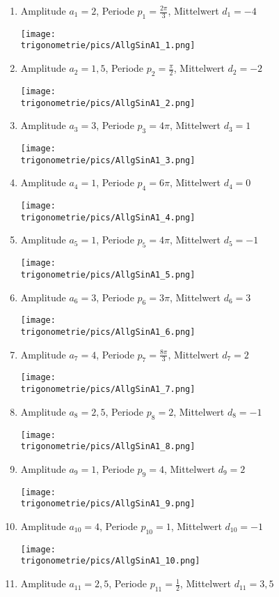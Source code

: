 \begin{Answer}[ref=allgSinCosA1]
	\begin{enumerate}[label=\alph*)]
		\item Amplitude \(a_{1}=2\), Periode \(p_{1}=\frac{2\pi}{3}\), Mittelwert \(d_{1}=-4\)

		\texttt{[image: \\trigonometrie/pics/AllgSinA1\_1.png]}
		\item Amplitude \(a_{2}=1,5\), Periode \(p_{2}=\frac{\pi}{2}\), Mittelwert \(d_{2}=-2\)

		\texttt{[image: \\trigonometrie/pics/AllgSinA1\_2.png]}
		\item Amplitude \(a_{3}=3\), Periode \(p_{3}=4\pi\), Mittelwert \(d_{3}=1\)

		\texttt{[image: \\trigonometrie/pics/AllgSinA1\_3.png]}
		\item Amplitude \(a_{4}=1\), Periode \(p_{4}=6\pi\), Mittelwert \(d_{4}=0\)

		\texttt{[image: \\trigonometrie/pics/AllgSinA1\_4.png]}
        \newpage
		\item Amplitude \(a_{5}=1\), Periode \(p_{5}=4\pi\), Mittelwert \(d_{5}=-1\)

		\texttt{[image: \\trigonometrie/pics/AllgSinA1\_5.png]}
		\item Amplitude \(a_{6}=3\), Periode \(p_{6}=3\pi\), Mittelwert \(d_{6}=3\)

		\texttt{[image: \\trigonometrie/pics/AllgSinA1\_6.png]}
		\item Amplitude \(a_{7}=4\), Periode \(p_{7}=\frac{8\pi}{3}\), Mittelwert \(d_{7}=2\)

		\texttt{[image: \\trigonometrie/pics/AllgSinA1\_7.png]}
		\item Amplitude \(a_{8}=2,5\), Periode \(p_{8}=2\), Mittelwert \(d_{8}=-1\)

		\texttt{[image: \\trigonometrie/pics/AllgSinA1\_8.png]}
        \newpage
		\item Amplitude \(a_{9}=1\), Periode \(p_{9}=4\), Mittelwert \(d_{9}=2\)

		\texttt{[image: \\trigonometrie/pics/AllgSinA1\_9.png]}
		\item Amplitude \(a_{10}=4\), Periode \(p_{10}=1\), Mittelwert \(d_{10}=-1\)

		\texttt{[image: \\trigonometrie/pics/AllgSinA1\_10.png]}
		\item Amplitude \(a_{11}=2,5\), Periode \(p_{11}=\frac{1}{2}\), Mittelwert \(d_{11}=3,5\)


\end{enumerate}
\end{Answer}
